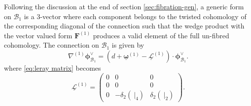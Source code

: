 \documentclass[11pt]{article}
\newcommand{\be}{\begin{equation}}
\newcommand{\ee}{\end{equation}}
\renewcommand{\L}{\mathcal{L}}
\newcommand{\B}{\mathcal{B}}
\newcommand{\bs}[1]{\boldsymbol{#1}}
\newcommand{\mat}[1]{\underline{\boldsymbol{#1}}}
\begin{document}
Following the discussion at the end of section \ref{sec:fibration-gen}, a generic form on $\B_1$ is a 3-vector where each component belongs to the twisted cohomology of the corresponding diagonal of the connection 
such that the wedge product with the vector valued form $\bs{F}^{(1)}$ produces a valid element of the full un-fibred cohomology. 
The connection on $\B_1$ is given by 
\be
	\nabla^{(1)} \bs{\phi}^\vee_{\B_1} 
	= (d  + \mat{\omega}^{(1)} - \mat{\L}^{(1)}) \cdot \bs{\phi}^\vee_{\B_1}.
\ee
where \eqref{eq:leray matrix} becomes 
\be
	\mat{\L}^{(1)} 
	= \begin{pmatrix} 
		0 & 0 & 0
		\\ 
		0 & 0 & 0
		\\
		0 & -\delta_2(\ \vert_4) & \delta_2(\ \vert_2)
	\end{pmatrix}.
\ee
\end{document}
